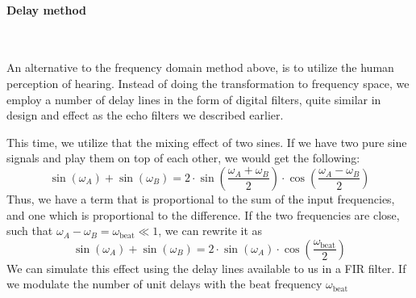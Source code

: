 \paragraph{Delay method}\mbox{}\\

An alternative to the frequency domain method above, is to utilize the human perception of hearing. Instead of doing the transformation to frequency space, we employ a number of delay lines in the form of digital filters, quite similar in design and effect as the echo filters we described earlier.

This time, we utilize that the mixing effect of two sines. If we have two pure sine signals and play them on top of each other, we would get the following:
\begin{equation}
\sin(\omega_{A}) + \sin(\omega_{B}) = 2 \cdot \sin \left( \frac{\omega_{A} + \omega_{B}}{2} \right) \cdot \cos \left( \frac{\omega_{A} - \omega_{B}}{2} \right)
\label{eqn:chorusbeat}
\end{equation}
Thus, we have a term that is proportional to the sum of the input frequencies, and one which is proportional to the difference. If the two frequencies are close, such that $\omega_{A} - \omega_{B}  = \omega_{\textrm{beat}} \ll 1$, we can rewrite it as
\begin{equation}
\sin(\omega_{A}) + \sin(\omega_{B}) = 2 \cdot \sin (\omega_{A}) \cdot \cos \left( \frac{\omega_{\textrm{beat}}}{2} \right)
\label{eqn:chorusbeatsimple}
\end{equation}
We can simulate this effect using the delay lines available to us in a FIR filter. If we modulate the number of unit delays with the beat frequency $\omega_{\textrm{beat}}$
